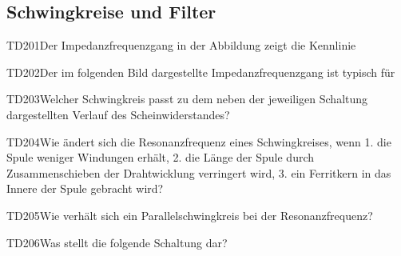 \subsection{Schwingkreise und Filter}

\begin{question}{TD201}{Der Impedanzfrequenzgang in der Abbildung zeigt die Kennlinie}
\end{question}

\begin{question}{TD202}{Der im folgenden Bild dargestellte Impedanzfrequenzgang ist typisch für}
\end{question}

\begin{question}{TD203}{Welcher Schwingkreis passt zu dem neben der jeweiligen Schaltung dargestellten Verlauf des Scheinwiderstandes?}
\answer{}
\answer{}
\answer{}
\answer{}
\end{question}

\begin{question}{TD204}{Wie ändert sich die Resonanzfrequenz eines Schwingkreises, wenn 1. die Spule weniger Windungen erhält, 2. die Länge der Spule durch Zusammenschieben der Drahtwicklung verringert wird, 3. ein Ferritkern in das Innere der Spule gebracht wird?}
\end{question}

\begin{question}{TD205}{Wie verhält sich ein Parallelschwingkreis bei der Resonanzfrequenz?}
\end{question}

\begin{question}{TD206}{Was stellt die folgende Schaltung dar?}
\end{question}

